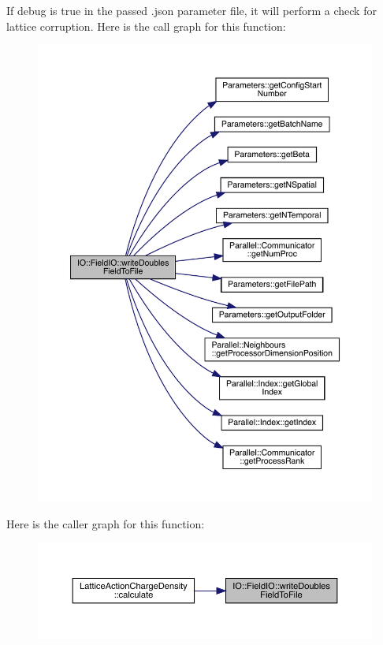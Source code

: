 If debug is true in the passed .json parameter file, it will perform a check for lattice corruption. Here is the call graph for this function\+:\nopagebreak
\begin{figure}[H]
\begin{center}
\leavevmode
\includegraphics[width=350pt]{class_i_o_1_1_field_i_o_aaf2bac2025d67c06e7c61e8cc9f44777_cgraph}
\end{center}
\end{figure}
Here is the caller graph for this function\+:\nopagebreak
\begin{figure}[H]
\begin{center}
\leavevmode
\includegraphics[width=350pt]{class_i_o_1_1_field_i_o_aaf2bac2025d67c06e7c61e8cc9f44777_icgraph}
\end{center}
\end{figure}
\mbox{\label{class_i_o_1_1_field_i_o_a8af607f9a1d79e90d4514c36103c6601}} 
